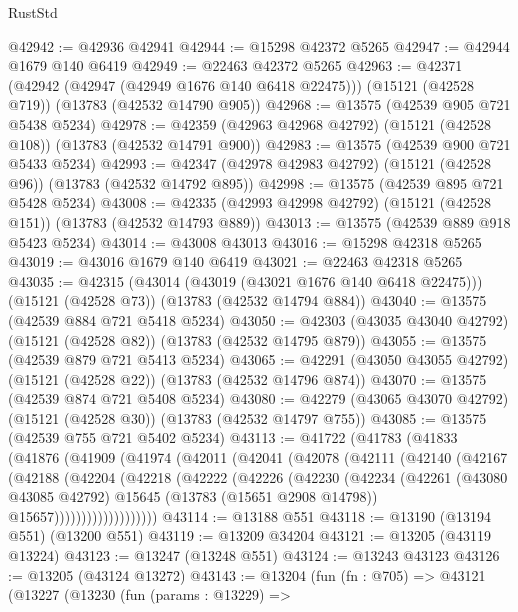 \begin{lexlean}{RustStd}
\begin{coremodule}
@42942 := @42936 @42941
@42944 := @15298 @42372 @5265
@42947 := @42944 @1679 @140 @6419
@42949 := @22463 @42372 @5265
@42963 := @42371
    (@42942 (@42947 (@42949 @1676 @140 @6418 @22475)))
    (@15121 (@42528 @719))
    (@13783 (@42532 @14790 @905))
@42968 := @13575 (@42539 @905 @721 @5438 @5234)
@42978 := @42359 (@42963 @42968 @42792) (@15121 (@42528 @108)) (@13783 (@42532 @14791 @900))
@42983 := @13575 (@42539 @900 @721 @5433 @5234)
@42993 := @42347 (@42978 @42983 @42792) (@15121 (@42528 @96)) (@13783 (@42532 @14792 @895))
@42998 := @13575 (@42539 @895 @721 @5428 @5234)
@43008 := @42335 (@42993 @42998 @42792) (@15121 (@42528 @151)) (@13783 (@42532 @14793 @889))
@43013 := @13575 (@42539 @889 @918 @5423 @5234)
@43014 := @43008 @43013
@43016 := @15298 @42318 @5265
@43019 := @43016 @1679 @140 @6419
@43021 := @22463 @42318 @5265
@43035 := @42315
    (@43014 (@43019 (@43021 @1676 @140 @6418 @22475)))
    (@15121 (@42528 @73))
    (@13783 (@42532 @14794 @884))
@43040 := @13575 (@42539 @884 @721 @5418 @5234)
@43050 := @42303 (@43035 @43040 @42792) (@15121 (@42528 @82)) (@13783 (@42532 @14795 @879))
@43055 := @13575 (@42539 @879 @721 @5413 @5234)
@43065 := @42291 (@43050 @43055 @42792) (@15121 (@42528 @22)) (@13783 (@42532 @14796 @874))
@43070 := @13575 (@42539 @874 @721 @5408 @5234)
@43080 := @42279 (@43065 @43070 @42792) (@15121 (@42528 @30)) (@13783 (@42532 @14797 @755))
@43085 := @13575 (@42539 @755 @721 @5402 @5234)
@43113 := @41722
    (@41783
      (@41833
        (@41876
          (@41909
            (@41974
              (@42011
                (@42041
                  (@42078
                    (@42111
                      (@42140
                        (@42167
                          (@42188
                            (@42204
                              (@42218
                                (@42222
                                  (@42226
                                    (@42230
                                      (@42234
                                        (@42261
                                          (@43080 @43085 @42792)
                                          @15645
                                          (@13783 (@15651 @2908 @14798))
                                          @15657)))))))))))))))))))
@43114 := @13188 @551
@43118 := @13190 (@13194 @551) (@13200 @551)
@43119 := @13209 @34204
@43121 := @13205 (@43119 @13224)
@43123 := @13247 (@13248 @551)
@43124 := @13243 @43123
@43126 := @13205 (@43124 @13272)
@43143 := @13204
    (fun (fn : @705) =>
    @43121
      (@13227
        (@13230
          (fun (params : @13229) =>

\end{coremodule}
\end{lexlean}
